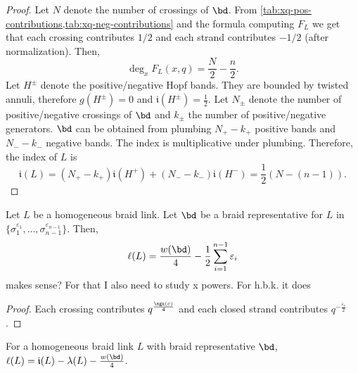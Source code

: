 \documentclass[11pt,e-only]{amsart}
\begin{document}
\begin{proof}
    Let $N$ denote the number of crossings of $\bd$. From \cref{tab:xq-pos-contributions,tab:xq-neg-contributions} and the formula computing $F_L$ we get that each crossing contributes $1/2$ and each strand contributes $-1/2$ (after normalization). Then,
    \begin{equation}
        \deg_x F_L(x,q) = \frac{N}{2}- \frac{n}{2}.
    \end{equation}
    Let $H^{\pm}$ denote the positive/negative Hopf bands. They are bounded by twisted annuli, therefore $g(H^{\pm})=0$ and $\mathfrak{i}(H^{\pm})=\frac12$. Let $N_{\pm}$ denote the number of positive/negative crossings of $\bd$ and $k_{\pm}$ the number of positive/negative generators. $\bd$ can be obtained from plumbing $N_{+}-k_+$ positive bands and $N_{-}-k_-$ negative bands. The index is multiplicative under plumbing. Therefore, the index of $L$ is
    \begin{equation}
        \mathfrak{i}(L)= \left(N_{+}-k_+\right)\mathfrak{i}(H^+)+\left(N_{-}-k_-\right)\mathfrak{i}(H^-) = \frac{1}{2}\left(N - (n-1)\right).
    \end{equation}
\end{proof}


\begin{proposition} Let $L$ be a homogeneous braid link. Let $\bd$ be a braid representative for $L$ in $\{\sigma_1^{\varepsilon_1},\dots,\sigma_{n-1}^{\varepsilon_{n-1}}\}$. Then,
\begin{equation}
    \ell(L)= \frac{w(\bd)}{4}-\frac12 \sum_{i=1}^{n-1}\varepsilon_i
\end{equation}
\alert{makes sense? For that I also need to study x powers. For h.b.k. it does}
\end{proposition}

\begin{proof} Each crossing contributes $q^{\frac{\sgn(c)}{4}}$ and each closed strand contributes $q^{-\frac{\varepsilon_i}{2}}$.    
\end{proof}



\begin{remark} For a homogeneous braid link $L$ with braid representative $\bd$, $\ell(L)=\mathfrak{i}(L)-\lambda(L)-\frac{w(\bd)}{4}$.
\end{remark}
\end{document}
